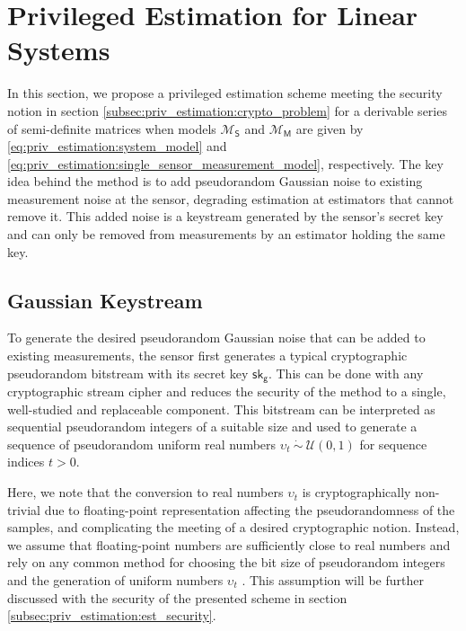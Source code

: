 \section{Privileged Estimation for Linear Systems}\label{sec:priv_estimation:privileged_estimation}
In this section, we propose a privileged estimation scheme meeting the security notion in section \ref{subsec:priv_estimation:crypto_problem} for a derivable series of semi-definite matrices when models $\mathcal{M}_{\mathsf{S}}$ and $\mathcal{M}_{\mathsf{M}}$ are given by \eqref{eq:priv_estimation:system_model} and \eqref{eq:priv_estimation:single_sensor_measurement_model}, respectively. The key idea behind the method is to add pseudorandom Gaussian noise to existing measurement noise at the sensor, degrading estimation at estimators that cannot remove it. This added noise is a keystream generated by the sensor's secret key and can only be removed from measurements by an estimator holding the same key.

% 
% 

\subsection{Gaussian Keystream}\label{subsec:priv_estimation:est_gaussian_keystream}
To generate the desired pseudorandom Gaussian noise that can be added to existing measurements, the sensor first generates a typical cryptographic pseudorandom bitstream with its secret key $\mathsf{sk}_{\mathsf{g}}$. This can be done with any cryptographic stream cipher and reduces the security of the method to a single, well-studied and replaceable component. This bitstream can be interpreted as sequential pseudorandom integers of a suitable size and used to generate a sequence of pseudorandom uniform real numbers $\upsilon_t\ \dot{\sim}\ \mathcal{U}(0,1)$ for sequence indices $t>0$.

Here, we note that the conversion to real numbers $\upsilon_t$ is cryptographically non-trivial due to floating-point representation affecting the pseudorandomness of the samples, and complicating the meeting of a desired cryptographic notion. Instead, we assume that floating-point numbers are sufficiently close to real numbers and rely on any common method for choosing the bit size of pseudorandom integers and the generation of uniform numbers $\upsilon_t$ \cite{goualardGeneratingRandomFloatingPoint2020}. This assumption will be further discussed with the security of the presented scheme in section \ref{subsec:priv_estimation:est_security}.

